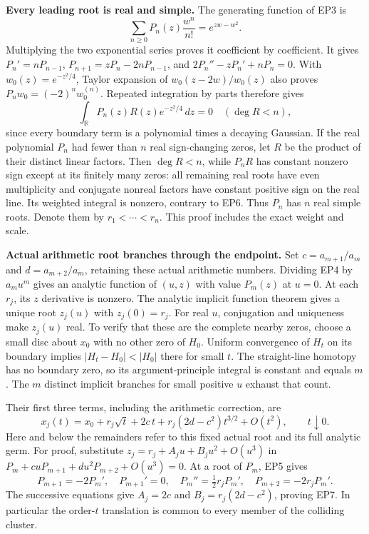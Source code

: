 \EP\textbf{Every leading root is real and simple.}
The generating function of EP3 is
\[
 \sum_{n\ge0}P_n(z)\frac{w^n}{n!}=e^{zw-w^2}.
 \tag{EP5}
\]
Multiplying the two exponential series proves it coefficient by
coefficient. It gives $P_n'=nP_{n-1}$,
$P_{n+1}=zP_n-2nP_{n-1}$, and
$2P_n''-zP_n'+nP_n=0$.
With $w_0(z)=e^{-z^2/4}$, Taylor expansion of
$w_0(z-2w)/w_0(z)$ also proves
$P_nw_0=(-2)^nw_0^{(n)}$.
Repeated integration by parts therefore gives
\[
 \int_{\mathbb R}P_n(z)R(z)e^{-z^2/4}\,dz=0
       \quad (\deg R<n),
 \tag{EP6}
\]
since every boundary term is a polynomial times a decaying Gaussian.
If the real polynomial $P_n$ had fewer than $n$ real sign-changing
zeros, let $R$ be the product of their distinct linear factors.
Then $\deg R<n$, while $P_nR$ has constant nonzero sign except
at its finitely many zeros: all remaining real roots have even
multiplicity and conjugate nonreal factors have constant positive
sign on the real line. Its weighted integral is nonzero, contrary
to EP6. Thus $P_n$ has $n$ real simple roots. Denote them by
$r_1<\cdots<r_n$. This proof includes the exact weight and scale.

\EP\textbf{Actual arithmetic root branches through the endpoint.}
Set $c=a_{m+1}/a_m$ and $d=a_{m+2}/a_m$, retaining these actual
arithmetic numbers. Dividing EP4 by $a_mu^m$ gives an analytic
function of $(u,z)$ with value $P_m(z)$ at $u=0$.
At each $r_j$, its $z$ derivative is nonzero. The analytic implicit
function theorem gives a unique root $z_j(u)$ with $z_j(0)=r_j$.
For real $u$, conjugation and uniqueness make $z_j(u)$ real.
To verify that these are the complete nearby zeros, choose a small
disc about $x_0$ with no other zero of $H_0$. Uniform convergence of
$H_t$ on its boundary implies
$|H_t-H_0|<|H_0|$ there for small $t$. The straight-line homotopy
has no boundary zero, so its argument-principle integral is
constant and equals $m$. The $m$ distinct implicit branches for
small positive $u$ exhaust that count.

Their first three terms, including the arithmetic correction, are
\[
 x_j(t)=x_0+r_j\sqrt t+2c\,t
              +r_j(2d-c^2)t^{3/2}+O(t^2),\qquad t\downarrow0.
 \tag{EP7}\label{ep:roots}
\]
Here and below the remainders refer to this fixed actual root and
its full analytic germ. For proof, substitute
$z_j=r_j+A_ju+B_ju^2+O(u^3)$ in
$P_m+cuP_{m+1}+du^2P_{m+2}+O(u^3)=0$.
At a root of $P_m$, EP5 gives
\[
 P_{m+1}=-2P_m',\quad P_{m+1}'=0,\quad
 P_m''=\tfrac12r_jP_m',\quad P_{m+2}=-2r_jP_m'.
\]
The successive equations give $A_j=2c$ and
$B_j=r_j(2d-c^2)$, proving EP7. In particular the order-$t$
translation is common to every member of the colliding cluster.

